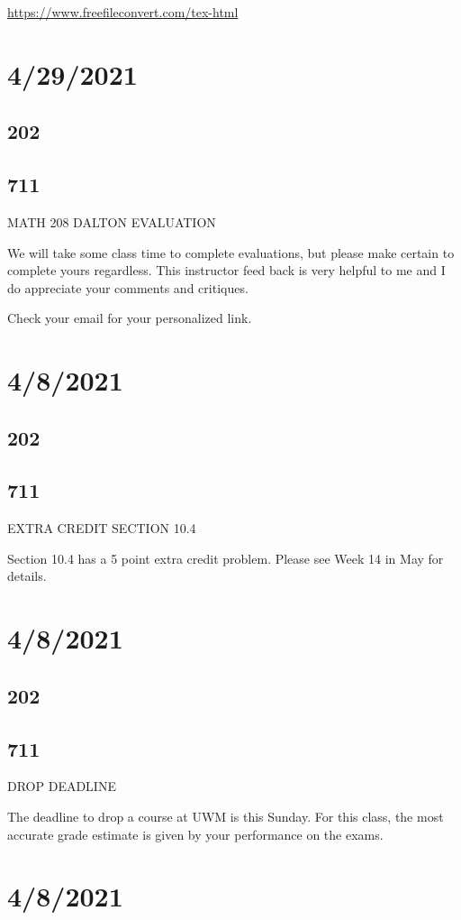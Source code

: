 \documentclass[]{article}
\begin{document}
	
\url{https://www.freefileconvert.com/tex-html}

\section*{4/29/2021}
\subsection*{202}
\subsection*{711}
MATH 208 DALTON EVALUATION

We will take some class time to complete evaluations, but please make certain to complete yours regardless. This instructor feed back is very helpful to me and I do appreciate your comments and critiques.

Check your email for your personalized link.

\section*{4/8/2021}
\subsection*{202}
\subsection*{711}
EXTRA CREDIT SECTION 10.4

Section 10.4 has a 5 point extra credit problem. Please see Week 14 in May for details.

\section*{4/8/2021}
\subsection*{202}
\subsection*{711}
DROP DEADLINE

The deadline to drop a course at UWM is this Sunday. For this class, the most accurate grade estimate is given by your performance on the exams.

\section*{4/8/2021}
\end{document}
